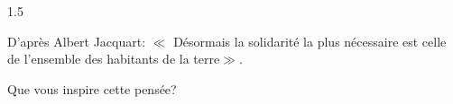 \documentclass[12pt]{article}
\begin{document}
\begin{spacing}{1.5}

D'après Albert Jacquart: $\ll$ Désormais la solidarité la plus nécessaire est celle de l'ensemble des habitants de la terre$\gg$.

Que vous inspire cette pensée?

\quad

\end{spacing}
\end{document}
